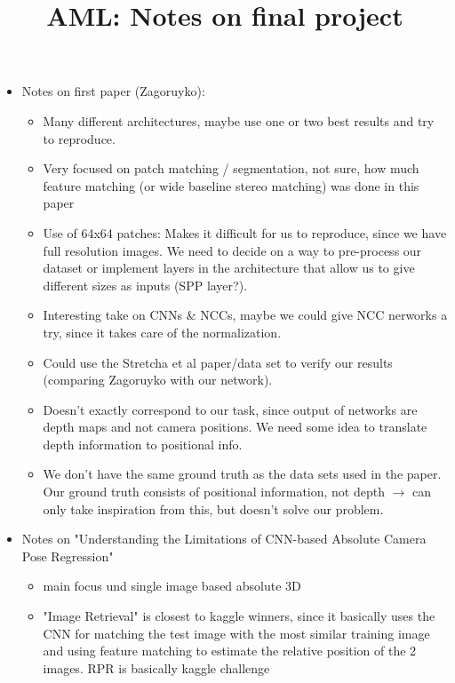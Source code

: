 \documentclass{article}
\begin{document}
\title{\textbf{AML: Notes on final project}}

\maketitle
\large

\begin{itemize}
\item Notes on first paper (Zagoruyko):

\begin{itemize}
\item Many different architectures, maybe use one or two best results and try to reproduce.
\item Very focused on patch matching / segmentation, not sure, how much feature matching (or wide baseline stereo matching) was done in this paper
\item Use of 64x64 patches: Makes it difficult for us to reproduce, since we have full resolution images. We need to decide on a way to pre-process our dataset or implement layers in the architecture that allow us to give different sizes as inputs (SPP layer?).
\item Interesting take on CNNs \& NCCs, maybe we could give NCC nerworks a try, since it takes care of the normalization.
\item Could use the Stretcha et al paper/data set to verify our results (comparing Zagoruyko with our network).
\item Doesn't exactly correspond to our task, since output of networks are depth maps and not camera positions. We need some idea to translate depth information to positional info.
\item We don't have the same ground truth as the data sets used in the paper. Our ground truth consists of positional information, not depth $\rightarrow$ can only take inspiration from this, but doesn't solve our problem.
\end{itemize}

\item Notes on "Understanding the Limitations of CNN-based Absolute Camera Pose Regression"
\begin{itemize}
\item main focus und single image based absolute 3D
\item "Image Retrieval" is closest to kaggle winners, since it basically uses the CNN for matching the test image with the most similar training image and using feature matching to estimate the relative position of the 2 images. RPR is basically kaggle challenge
\end{itemize}




\end{itemize}
\end{document}
